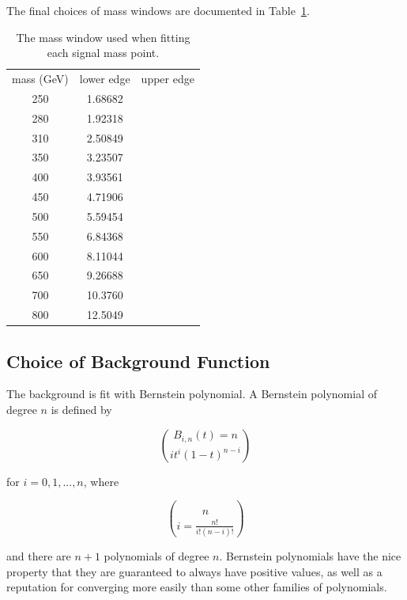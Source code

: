 The final choices of mass windows are documented in Table~\ref{tab:mass_windows}.

\begin{table}
   \caption{The mass window used when fitting each signal mass point. \label{tab:mass_windows} }
    \begin{tabular}{ c c c }
    mass (GeV) & lower edge & upper edge \\
    250        & 1.68682  & \\
    280        & 1.92318 & \\
    310        & 2.50849 & \\
    350        & 3.23507 & \\
    400        & 3.93561 & \\
    450        & 4.71906 & \\
    500        & 5.59454 & \\
    550        & 6.84368 & \\
    600        & 8.11044 & \\
    650        & 9.26688 & \\
    700        & 10.3760 & \\
    800        & 12.5049 & \\
    \end{tabular}
\end{table}







\subsection{Choice of Background Function}
The background is fit with Bernstein polynomial.  A Bernstein polynomial of degree $n$ is 
defined by

\begin{equation}
B_{i,n}(t) = n\choose{i} t^i (1-t)^{n-i}
\end{equation}

for $i=0,1,...,n$, where

\begin{equation}
n\choose{i} = \frac{n!}{i!(n-i)!}
\end{equation}

and there are $n+1$ polynomials of degree $n$.  Bernstein polynomials have the nice property
that they are guaranteed to always have positive values, as well as a reputation for 
converging more easily than some other families of polynomials.

